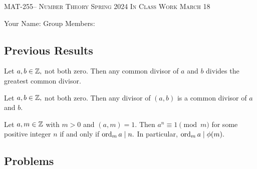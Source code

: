 \documentclass[handout]{ximera}
\date{March 18, 2024}
\begin{document}
\handoutAbstract
\maketitle
 	\begin{center}%
    		{\large \scshape MAT-255-- Number Theory 
			\hfill Spring 2024 
			\hfill In Class Work March 18}%
    
		{\large Your Name: \hrulefill \quad 
			Group Members:\hrulefill \quad 
			\hrulefill
			\par}%
 	\end{center}%
	
 \subsection*{Previous Results}
 \begin{lemma}\label{lem:gcd_mult}
	Let $a,b\in\mathbb Z,$ not both zero. Then any  common divisor of $a$ and $b$ divides the greatest common divisor.
\end{lemma}


\begin{lemma}\label{lem:gcd_trans}
 	Let $a,b\in\mathbb Z,$ not both zero. Then any divisor of $(a,b)$ is a common divisor of $a$ and $b$.
\end{lemma}
 
 \begin{prop*}[Proposition 5.1]\label{prop:order_divides_phi}
    Let $a,m\in\mathbb Z$ with $m>0$ and $(a,m)=1.$ Then $a^n\equiv 1\pmod{m}$ for some positive integer $n$ if and only if $\operatorname{ord}_m a\mid n.$ In particular, $\operatorname{ord}_m a\mid \phi(m).$
\end{prop*}

\subsection*{Problems}
\end{document}
